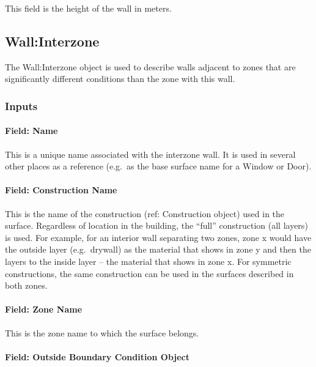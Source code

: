 This field is the height of the wall in meters.

\subsection{Wall:Interzone}\label{wallinterzone}

The Wall:Interzone object is used to describe walls adjacent to zones that are significantly different conditions than the zone with this wall.

\subsubsection{Inputs}\label{inputs-7-028}

\paragraph{Field: Name}\label{field-name-3-033}

This is a unique name associated with the interzone wall. It is used in several other places as a reference (e.g.~as the base surface name for a Window or Door).

\paragraph{Field: Construction Name}\label{field-construction-name-3}

This is the name of the construction (ref: Construction object) used in the surface. Regardless of location in the building, the ``full'' construction (all layers) is used. For example, for an interior wall separating two zones, zone x would have the outside layer (e.g.~drywall) as the material that shows in zone y and then the layers to the inside layer -- the material that shows in zone x. For symmetric constructions, the same construction can be used in the surfaces described in both zones.

\paragraph{Field: Zone Name}\label{field-zone-name-3-006}

This is the zone name to which the surface belongs.

\paragraph{Field: Outside Boundary Condition Object}\label{field-outside-boundary-condition-object}

